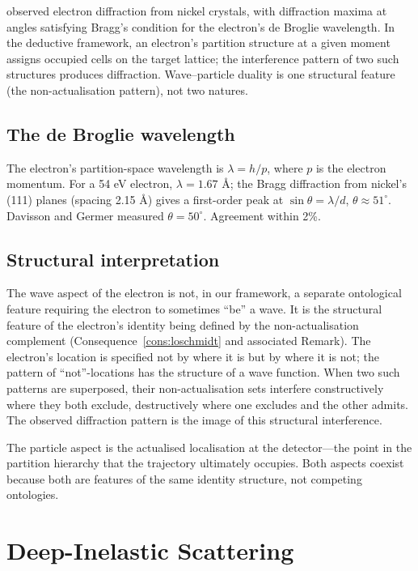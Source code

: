 \documentclass[11pt,twocolumn,a4paper]{article}
\theoremstyle{axiomstyle}
\theoremstyle{conseqstyle}
\theoremstyle{definition}
\theoremstyle{remark}
\begin{document}
\citet{davissongermer1927} observed electron diffraction from nickel crystals, with diffraction maxima at angles satisfying Bragg's condition for the electron's de Broglie wavelength. In the deductive framework, an electron's partition structure at a given moment assigns occupied cells on the target lattice; the interference pattern of two such structures produces diffraction. Wave--particle duality is one structural feature (the non-actualisation pattern), not two natures.

\subsection{The de Broglie wavelength}

The electron's partition-space wavelength is $\lambda=h/p$, where $p$ is the electron momentum. For a 54 eV electron, $\lambda=1.67$ \AA; the Bragg diffraction from nickel's (111) planes (spacing 2.15 \AA) gives a first-order peak at $\sin\theta=\lambda/d$, $\theta\approx 51^{\circ}$. Davisson and Germer measured $\theta=50^{\circ}$. Agreement within 2\%.

\subsection{Structural interpretation}

The wave aspect of the electron is not, in our framework, a separate ontological feature requiring the electron to sometimes ``be'' a wave. It is the structural feature of the electron's identity being defined by the non-actualisation complement (Consequence~\ref{cons:loschmidt} and associated Remark). The electron's location is specified not by where it is but by where it is not; the pattern of ``not''-locations has the structure of a wave function. When two such patterns are superposed, their non-actualisation sets interfere constructively where they both exclude, destructively where one excludes and the other admits. The observed diffraction pattern is the image of this structural interference.

The particle aspect is the actualised localisation at the detector---the point in the partition hierarchy that the trajectory ultimately occupies. Both aspects coexist because both are features of the same identity structure, not competing ontologies.

\section{Deep-Inelastic Scattering}
\label{sec:dis}
\end{document}
